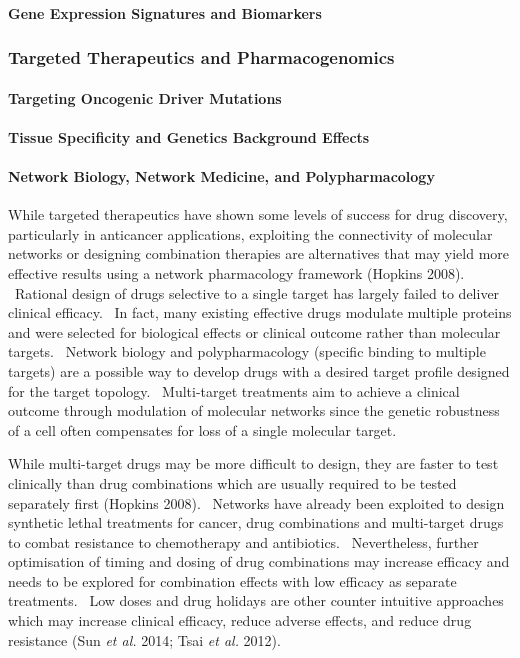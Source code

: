 \paragraph{Gene Expression Signatures and Biomarkers}
\subsubsection{Targeted Therapeutics and Pharmacogenomics}
\paragraph{Targeting Oncogenic Driver Mutations}
\paragraph{Tissue Specificity and Genetics Background Effects}
\paragraph{Network Biology, Network Medicine, and Polypharmacology}

While targeted therapeutics have shown some levels of success for drug discovery, particularly in anticancer applications, exploiting the connectivity of molecular networks or designing combination therapies are alternatives that may yield more effective results using a network pharmacology framework (Hopkins 2008). \ Rational design of drugs selective to a single target has largely failed to deliver clinical efficacy. \ In fact, many existing effective drugs modulate multiple proteins and were selected for biological effects or clinical outcome rather than molecular targets. \ Network biology and polypharmacology (specific binding to multiple targets) are a possible way to develop drugs with a desired target profile designed for the target topology. \ Multi-target treatments aim to achieve a clinical outcome through modulation of molecular networks since the genetic robustness of a cell often compensates for loss of a single molecular target. \  

While multi-target drugs may be more difficult to design, they are faster to test clinically than drug combinations which are usually required to be tested separately first (Hopkins 2008). \ Networks have already been exploited to design synthetic lethal treatments for cancer, drug combinations and multi-target drugs to combat resistance to chemotherapy and antibiotics. \ Nevertheless, further optimisation of timing and dosing of drug combinations may increase efficacy and needs to be explored for combination effects with low efficacy as separate treatments. \ Low doses and drug holidays are other counter intuitive approaches which may increase clinical efficacy, reduce adverse effects, and reduce drug resistance (Sun\textit{ et al.} 2014; Tsai\textit{ et al.} 2012). \  

